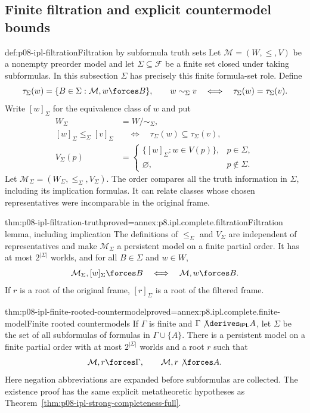 \subsection{Finite filtration and explicit countermodel bounds}
\label{sec:p08-ipl-finite-filtration}

\begin{hbdefinition}{def:p08-ipl-filtration}{Filtration by subformula truth sets}
Let \(\mathcal M=(W,\leq,V)\) be a nonempty preorder model and let
\(\Sigma\subseteq\mathcal F\) be a finite set closed under taking
subformulas. In this subsection \(\Sigma\) has precisely this finite
formula-set role. Define
\[
 \tau_\Sigma(w)=\{B\in\Sigma:\mathcal M,w\forces B\},\qquad
 w\sim_\Sigma v\quad\Longleftrightarrow\quad
 \tau_\Sigma(w)=\tau_\Sigma(v).
\]
Write \([w]_\Sigma\) for the equivalence class of \(w\) and put
\[
 \begin{split}
 W_\Sigma&=W/{\sim_\Sigma},\\
 [w]_\Sigma\leq_\Sigma[v]_\Sigma
   &\quad\Longleftrightarrow\quad
     \tau_\Sigma(w)\subseteq\tau_\Sigma(v),\\
 V_\Sigma(p)&=
 \begin{cases}
  \{[w]_\Sigma:w\in V(p)\},&p\in\Sigma,\\
  \varnothing,&p\notin\Sigma.
 \end{cases}
 \end{split}
\]
Let \(\mathcal M_\Sigma=(W_\Sigma,\leq_\Sigma,V_\Sigma)\).
The order compares all the truth information in \(\Sigma\), including
its implication formulas. It can relate classes whose chosen
representatives were incomparable in the original frame.
\end{hbdefinition}

\begin{hblemma}{thm:p08-ipl-filtration-truth}{proved=annex:p8.ipl.complete.filtration}{Filtration lemma, including implication}
The definitions of \(\leq_\Sigma\) and \(V_\Sigma\) are independent
of representatives and make \(\mathcal M_\Sigma\) a persistent model
on a finite partial order. It has at most \(2^{|\Sigma|}\) worlds,
and for all \(B\in\Sigma\) and \(w\in W\),
\[
 \mathcal M_\Sigma,[w]_\Sigma\forces B
 \quad\Longleftrightarrow\quad\mathcal M,w\forces B.
\]
If \(r\) is a root of the original frame, \([r]_\Sigma\) is a root
of the filtered frame.
\end{hblemma}

\begin{hbtheorem}{thm:p08-ipl-finite-rooted-countermodel}{proved=annex:p8.ipl.complete.finite-model}{Finite rooted countermodels}
If \(\Gamma\) is finite and
\(\Gamma\not\derives_{\mathsf{IPL}}A\), let \(\Sigma\) be the
set of all subformulas of formulas in \(\Gamma\cup\{A\}\).
There is a persistent model on a finite partial order with at most
\(2^{|\Sigma|}\) worlds and a root \(r\) such that
\[
 \mathcal M,r\forces\Gamma,
 \qquad \mathcal M,r\not\forces A.
\]
Here negation abbreviations are expanded before subformulas are collected.
The existence proof has the same explicit metatheoretic hypotheses as
Theorem~\ref{thm:p08-ipl-strong-completeness-full}.
\end{hbtheorem}

